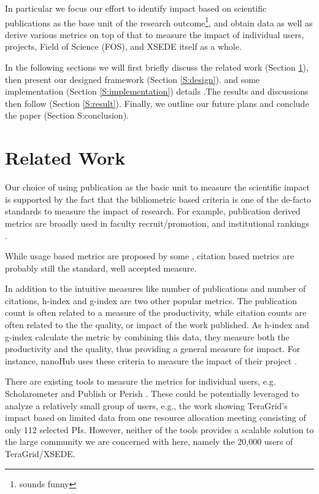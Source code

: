 \documentclass{sig-alternate}
\begin{document}
In particular we focus our effort to identify impact based on scientific publications as the base unit of the research outcome\footnote{sounds funny}, and obtain data as well as derive various metrics on top of that to measure the impact of individual users, projects, Field of Science (FOS), and XSEDE itself as a whole. 
 
In the following sections we will first briefly discuss the related work (Section \ref{S:related}), then present our designed framework (Section \ref{S:design}). and some implementation (Section \ref{S:implementation}) details .The results and discussions then follow (Section \ref{S:result}). Finally, we outline our future plans and conclude the paper (Section {S:conclusion}). 
 
 
 
\section{Related Work} \label{S:related}
 
Our choice of using publication as the basic unit to measure the scientific impact is supported by the fact that the bibliometric based criteria is one of the de-facto standards to measure the impact of research. For example, publication derived metrics are broadly used in faculty recruit/promotion, and institutional rankings \cite{thomas1998institutional}. 
 
While usage based metrics are proposed by some \cite{Bollen:2007:MUM:1255175.1255273,Bollen:2008:TUI:1378889.1378928, bollen2009principal}, citation based metrics are probably still the standard, well accepted measure. 

In addition to the intuitive measures like number of publications and number of citations, h-index \cite{hirsch2005index} and g-index \cite{egghe2006theory} are two other popular metrics. The publication count is often related to a measure of the productivity, while citation counts are often related to the the quality, or impact of the work published. As h-index and g-index calculate the metric by combining this data, they measure both the productivity and the quality, thus providing a general measure for impact. For instance, nanoHub uses these criteria to measure the impact of their project \cite{www-nanohubcite}.
 
There are existing tools to measure the metrics for individual users, e.g. Scholarometer \cite{kaur2012scholarometer} and Publish or Perish \cite{www-pop}. These could be potentially leveraged to analyze a relatively small group of users, e.g., the work \cite{bollen2011and} showing TeraGrid's impact based on limited data from one resource allocation meeting consisting of  only 112 selected PIs. 
However, neither of the tools provides a scalable solution to the large community we are concerned with here, namely the 20,000 users of TeraGrid/XSEDE.  
 
\end{document}
